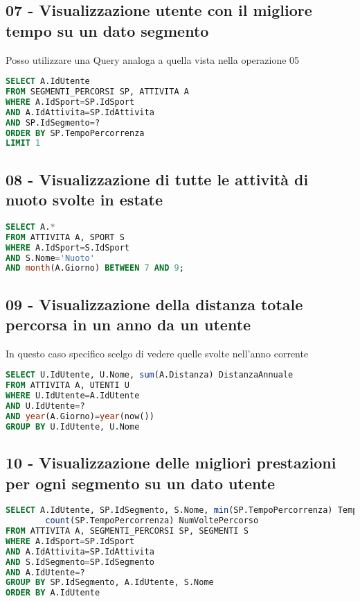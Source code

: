 \documentclass[12pt]{report}
\begin{document}
\subsection*{07 - Visualizzazione utente con il migliore tempo su un dato segmento}
Posso utilizzare una Query analoga a quella vista nella operazione 05
\begin{lstlisting}[style=sql, language=SQL, label=lst:sql-query]
SELECT A.IdUtente
FROM SEGMENTI_PERCORSI SP, ATTIVITA A
WHERE A.IdSport=SP.IdSport
AND A.IdAttivita=SP.IdAttivita
AND SP.IdSegmento=?
ORDER BY SP.TempoPercorrenza
LIMIT 1
\end{lstlisting}


\subsection*{08 - Visualizzazione di tutte le attività di nuoto svolte in estate}
\begin{lstlisting}[style=sql, language=SQL, label=lst:sql-query]
SELECT A.*
FROM ATTIVITA A, SPORT S
WHERE A.IdSport=S.IdSport
AND S.Nome='Nuoto'
AND month(A.Giorno) BETWEEN 7 AND 9;
\end{lstlisting}


\subsection*{09 - Visualizzazione della distanza totale percorsa in un anno da un utente}
In questo caso specifico scelgo di vedere quelle svolte nell'anno corrente
\begin{lstlisting}[style=sql, language=SQL, label=lst:sql-query]
SELECT U.IdUtente, U.Nome, sum(A.Distanza) DistanzaAnnuale
FROM ATTIVITA A, UTENTI U
WHERE U.IdUtente=A.IdUtente
AND U.IdUtente=?
AND year(A.Giorno)=year(now())
GROUP BY U.IdUtente, U.Nome
\end{lstlisting}


\subsection*{10 - Visualizzazione delle migliori prestazioni per ogni segmento su un dato utente}
\begin{lstlisting}[style=sql, language=SQL, label=lst:sql-query]
SELECT A.IdUtente, SP.IdSegmento, S.Nome, min(SP.TempoPercorrenza) TempoMinimo, 
        count(SP.TempoPercorrenza) NumVoltePercorso
FROM ATTIVITA A, SEGMENTI_PERCORSI SP, SEGMENTI S
WHERE A.IdSport=SP.IdSport
AND A.IdAttivita=SP.IdAttivita
AND S.IdSegmento=SP.IdSegmento
AND A.IdUtente=?
GROUP BY SP.IdSegmento, A.IdUtente, S.Nome
ORDER BY A.IdUtente
\end{lstlisting}
\end{document}
